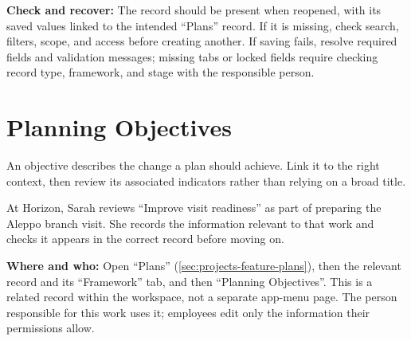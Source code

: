 \textbf{Check and recover:} The record should be present when reopened, with its saved values linked to the intended “Plans” record. If it is missing, check search, filters, scope, and access before creating another. If saving fails, resolve required fields and validation messages; missing tabs or locked fields require checking record type, framework, and stage with the responsible person.

\clearpage
\section{Planning Objectives}
\label{sec:projects-feature-planning-objectives}

An objective describes the change a plan should achieve. Link it to the right context, then review its associated indicators rather than relying on a broad title.

\begin{rcnote}
At Horizon, Sarah reviews “Improve visit readiness” as part of preparing the Aleppo branch visit. She records the information relevant to that work and checks it appears in the correct record before moving on.
\end{rcnote}

\textbf{Where and who:} Open “Plans” (\ref{sec:projects-feature-plans}), then the relevant record and its “Framework” tab, and then “Planning Objectives”. This is a related record within the workspace, not a separate app-menu page. The person responsible for this work uses it; employees edit only the information their permissions allow.

